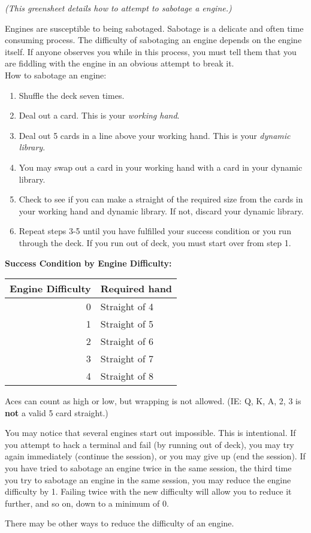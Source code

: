 \documentclass[green]{guildcamp4}
\begin{document}
\name{\gSabotage{}}

\emph{(This greensheet details how to attempt to sabotage a engine.)}

Engines are susceptible to being sabotaged. Sabotage is a delicate and often time consuming process. The difficulty of sabotaging an engine depends on the engine itself. If anyone observes you while in this process, you must tell them that you are fiddling with the engine in an obvious attempt to break it.\\

How to sabotage an engine:
\begin{enumerate}
	\item Shuffle the deck seven times.
	\item Deal out a card. This is your {\em working hand}.
	\item Deal out 5 cards in a line above your working hand. This is your {\em dynamic library}.
	\item You may swap out a card in your working hand with a card in your dynamic library.
	\item Check to see if you can make a straight of the required size from the cards in your working hand and dynamic library. If not, discard your dynamic library.
	\item Repeat steps 3-5 until you have fulfilled your success condition or you run through the deck.  If you run out of deck, you must start over from step 1.
\end{enumerate}

{\bf Success Condition by Engine Difficulty:}\\

\begin{tabular}{||r|l||}
	\hline\hline
	Engine Difficulty	& Required hand\\
	\hline
	0	& Straight of 4\\
	1	& Straight of 5\\
	2	& Straight of 6\\
	3	& Straight of 7\\
	4	& Straight of 8\\
	\hline\hline 
\end{tabular}

\vspace{10 mm}

Aces can count as high or low, but wrapping is not allowed. (IE: Q, K, A, 2, 3 is {\bf not} a valid 5 card straight.)

You may notice that several engines start out impossible. This is intentional. If you attempt to hack a terminal and fail (by running out of deck), you may try again immediately (continue the session), or you may give up (end the session). If you have tried to sabotage an engine twice in the same session, the third time you try to sabotage an engine in the same session, you may reduce the engine difficulty by 1. Failing twice with the new difficulty will allow you to reduce it further, and so on, down to a minimum of 0.

There may be other ways to reduce the difficulty of an engine.
\end{document}

